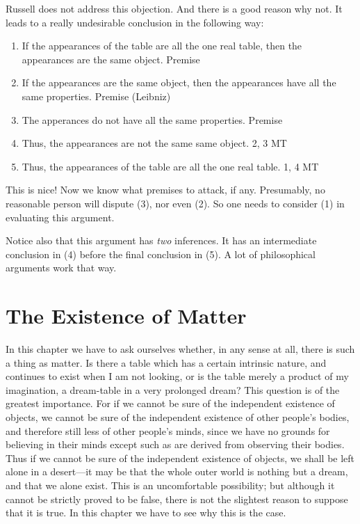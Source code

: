 \documentclass[oneside,letterpaper,12pt]{book}
\begin{document}
Russell does not address this objection. And there is a good reason why not. It leads to a really undesirable conclusion in the following way:
\begin{enumerate}
	\item If the appearances of the table are all the one real table, then the appearances are the same object. \hfill Premise
	\item If the appearances are the same object, then the appearances have all the same properties. \hfill Premise (Leibniz)
	\item The apperances do not have all the same properties. \hfill Premise
	\item Thus, the appearances are not the same same object. \hfill 2, 3 MT
	\item Thus, the appearances of the table are all the one real table. \hfill 1, 4 MT
\end{enumerate}
This is nice! Now we know what premises to attack, if any. Presumably, no reasonable person will dispute (3), nor even (2). So one needs to consider (1) in evaluating this argument.

Notice also that this argument has \textit{two} inferences. It has an intermediate conclusion in (4) before the final conclusion in (5). A lot of philosophical arguments work that way.

\hypertarget{chapter-ii.-the-existence-of-matter}{%
\chapter{The Existence of Matter}\label{chapter-ii.-the-existence-of-matter}}

In this chapter we have to ask ourselves whether, in any sense at all,
there is such a thing as matter. Is there a table which has a certain
intrinsic nature, and continues to exist when I am not looking, or is
the table merely a product of my imagination, a dream-table in a very
prolonged dream? This question is of the greatest importance. For if we
cannot be sure of the independent existence of objects, we cannot be
sure of the independent existence of other people's
bodies, and therefore still less of other people's
minds, since we have no grounds for believing in their minds except such
as are derived from observing their bodies. Thus if we cannot be sure of
the independent existence of objects, we shall be left alone in a
desert---it may be that the whole outer world is nothing but a dream,
and that we alone exist. This is an uncomfortable possibility; but
although it cannot be strictly proved to be false, there is not the
slightest reason to suppose that it is true. \label{proof} In this chapter we have to
see why this is the case.
\end{document}
